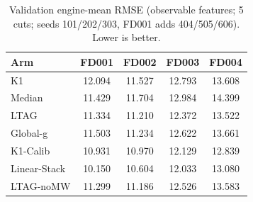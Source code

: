 \begin{table}[t]
\centering
\caption{Validation engine-mean RMSE (observable features; 5 cuts; seeds
101/202/303, FD001 adds 404/505/606). Lower is better.}
\label{tab:validation}
\begin{tabular}{lcccc}
\toprule
Arm & FD001 & FD002 & FD003 & FD004 \\
\midrule
K1 & 12.094 & 11.527 & 12.793 & 13.608 \\
Median & 11.429 & 11.704 & 12.984 & 14.399 \\
LTAG & 11.334 & 11.210 & 12.372 & 13.522 \\
Global-g & 11.503 & 11.234 & 12.622 & 13.661 \\
K1-Calib & 10.931 & 10.970 & 12.129 & 12.839 \\
Linear-Stack & 10.150 & 10.604 & 12.033 & 13.080 \\
LTAG-noMW & 11.299 & 11.186 & 12.526 & 13.583 \\
\bottomrule
\end{tabular}
\end{table}
